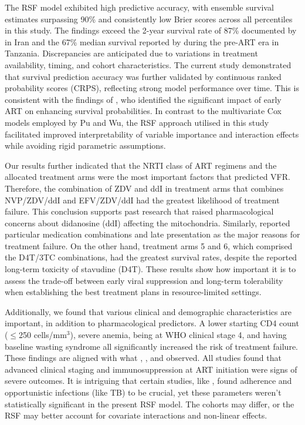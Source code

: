 \documentclass[10pt]{NSP1}
\begin{document}
The RSF model exhibited high predictive accuracy, with ensemble survival estimates surpassing 90\% and consistently low Brier scores across all percentiles in this study. The findings exceed the 2-year survival rate of 87\% documented by \cite{Afrashteh2023} in Iran and the 67\% median survival reported by \cite{Isingo2007} during the pre-ART era in Tanzania.  Discrepancies are anticipated due to variations in treatment availability, timing, and cohort characteristics.  The current study demonstrated that survival prediction accuracy was further validated by continuous ranked probability scores (CRPS), reflecting strong model performance over time.  This is consistent with the findings of \cite{Pu2024}, who identified the significant impact of early ART on enhancing survival probabilities.  In contrast to the multivariate Cox models employed by Pu and Wu, the RSF approach utilised in this study facilitated improved interpretability of variable importance and interaction effects while avoiding rigid parametric assumptions.

Our results further indicated that the NRTI class of ART regimens and the allocated treatment arms were the most important factors that predicted VFR. Therefore, the combination of ZDV and ddI in treatment arms that combines NVP/ZDV/ddI and EFV/ZDV/ddI had the greatest likelihood of treatment failure. This conclusion supports past research that raised pharmacological concerns about didanosine (ddI) affecting the mitochondria. Similarly, \cite{Nigussie2020} reported particular medication combinations and late presentation as the major reasons for treatment failure. On the other hand, treatment arms 5 and 6, which comprised the D4T/3TC combinations, had the greatest survival rates, despite the reported long-term toxicity of stavudine (D4T). These results show how important it is to assess the trade-off between early viral suppression and long-term tolerability when establishing the best treatment plans in resource-limited settings. 

Additionally, we found that various clinical and demographic characteristics are important, in addition to pharmacological predictors. A lower starting CD4 count ($\leq$250 cells/mm$^3$), severe anemia, being at WHO clinical stage 4, and having baseline wasting syndrome all significantly increased the risk of treatment failure. These findings are aligned with what \cite{Afrashteh2023}, \cite{Pu2024}, and \cite{Naghibifar2024} observed. All studies found that advanced clinical staging and immunosuppression at ART initiation were signs of severe outcomes. It is intriguing that certain studies, like \cite{Nigussie2020}, found adherence and opportunistic infections (like TB) to be crucial, yet these parameters weren't statistically significant in the present RSF model. The cohorts may differ, or the RSF may better account for covariate interactions and non-linear effects.
\end{document}
